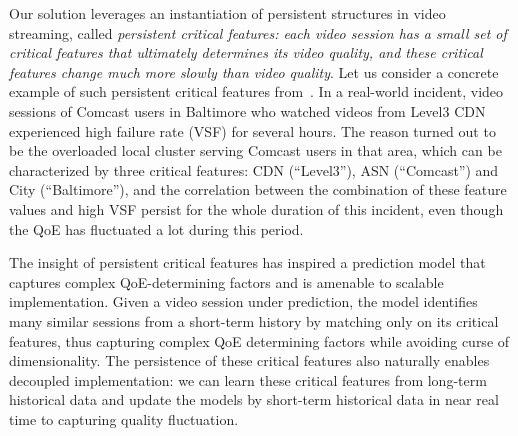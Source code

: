 Our solution leverages an instantiation of persistent structures
in video streaming, called 
{\em persistent critical features: each video session has 
a small set of critical features that ultimately determines 
its video quality, and these critical features change much 
more slowly than video quality}. 
Let us consider a concrete example of such persistent 
critical features from~\cite{cfa}.
In a real-world incident, video sessions of Comcast
users in Baltimore who watched videos from Level3
CDN experienced high failure rate (VSF) for several
hours. The reason turned out
to be the overloaded local cluster serving Comcast
users in that area,
which can be characterized by three critical features: 
CDN (``Level3''), ASN (``Comcast'') and City (``Baltimore''),
and the correlation between the combination of these
feature values and high VSF persist for the whole
duration of this incident, even though the QoE
has fluctuated a lot during this period.

The insight of persistent critical features has inspired
a prediction model that captures complex QoE-determining 
factors and is amenable to scalable implementation.
Given a video session under prediction, the model 
identifies many similar sessions from a short-term 
history by matching only on its critical features,
thus capturing complex QoE determining factors
while avoiding curse of dimensionality.
The persistence of these critical features also naturally
enables decoupled implementation: 
we can learn these critical features from long-term historical 
data and update the models by short-term historical data 
in near real time to capturing quality fluctuation.


